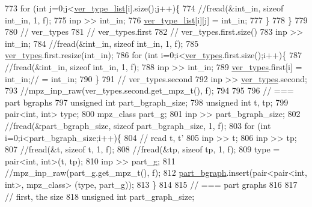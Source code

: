 \begin{DoxyCode}
773     \textcolor{keywordflow}{for} (\textcolor{keywordtype}{int} j=0;j<\hyperlink{classmarked__graph__compressed_af2e3e55223d436628a02758dfae88493}{ver\_type\_list}[i].size();j++)\{
774       \textcolor{comment}{//fread(&int\_in, sizeof int\_in, 1, f);}
775       inp >> int\_in;
776       \hyperlink{classmarked__graph__compressed_af2e3e55223d436628a02758dfae88493}{ver\_type\_list}[i][j] = int\_in;
777     \}
778   \}
779 
780   \textcolor{comment}{// ver\_types}
781   \textcolor{comment}{// ver\_types.first}
782   \textcolor{comment}{// ver\_types.first.size()}
783   inp >> int\_in;
784   \textcolor{comment}{//fread(&int\_in, sizeof int\_in, 1, f);}
785   \hyperlink{classmarked__graph__compressed_af446cc5e23c241a92b76642fd5ebc403}{ver\_types}.first.resize(int\_in);
786   \textcolor{keywordflow}{for} (\textcolor{keywordtype}{int} i=0;i<\hyperlink{classmarked__graph__compressed_af446cc5e23c241a92b76642fd5ebc403}{ver\_types}.first.size();i++)\{
787     \textcolor{comment}{//fread(&int\_in, sizeof int\_in, 1, f);}
788     inp >> int\_in;
789     \hyperlink{classmarked__graph__compressed_af446cc5e23c241a92b76642fd5ebc403}{ver\_types}.first[i] = int\_in;\textcolor{comment}{// = int\_in;}
790   \}
791   \textcolor{comment}{// ver\_types.second}
792   inp >> \hyperlink{classmarked__graph__compressed_af446cc5e23c241a92b76642fd5ebc403}{ver\_types}.second;
793   \textcolor{comment}{//mpz\_inp\_raw(ver\_types.second.get\_mpz\_t(), f);}
794 
795 
796   \textcolor{comment}{// === part bgraphs}
797   \textcolor{keywordtype}{unsigned} \textcolor{keywordtype}{int} part\_bgraph\_size;
798   \textcolor{keywordtype}{unsigned} \textcolor{keywordtype}{int} t, tp;
799   pair<int, int> type; 
800   mpz\_class part\_g;
801   inp >> part\_bgraph\_size;
802   \textcolor{comment}{//fread(&part\_bgraph\_size, sizeof part\_bgraph\_size, 1, f);}
803   \textcolor{keywordflow}{for} (\textcolor{keywordtype}{int} i=0;i<part\_bgraph\_size;i++)\{
804     \textcolor{comment}{// read t, t'}
805     inp >> t;
806     inp >> tp;
807     \textcolor{comment}{//fread(&t, sizeof t, 1, f);}
808     \textcolor{comment}{//fread(&tp, sizeof tp, 1, f);}
809     type = pair<int, int>(t, tp);
810     inp >> part\_g;
811     \textcolor{comment}{//mpz\_inp\_raw(part\_g.get\_mpz\_t(), f);}
812     \hyperlink{classmarked__graph__compressed_a7b3267063fba30b45eb21b3ba4e07536}{part\_bgraph}.insert(pair<pair<int, int>, mpz\_class> (type, part\_g));
813   \}
814 
815   \textcolor{comment}{// === part graphs}
816 
817   \textcolor{comment}{// first, the size}
818   \textcolor{keywordtype}{unsigned} \textcolor{keywordtype}{int} part\_graph\_size;

\end{DoxyCode}
